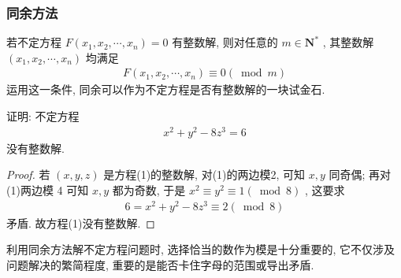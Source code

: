 \subsubsection{同余方法}
若不定方程 $F\left(x_{1}, x_{2}, \cdots, x_{n}\right)=0$ 有整数解, 则对任意的 $m \in \mathbf{N}^{*}$ , 其整数解 $\left(x_{1}, x_{2}, \cdots, x_{n}\right)$ 均满足
\begin{align*}
	F\left(x_{1}, x_{2}, \cdots, x_{n}\right) \equiv 0(\bmod m)
\end{align*}
运用这一条件, 同余可以作为不定方程是否有整数解的一块试金石.

\begin{example}
	证明: 不定方程
	\begin{align*}
		x^{2}+y^{2}-8 z^{3}=6
	\end{align*}
	没有整数解.
\end{example}
\begin{proof}
	若 $(x, y, z)$ 是方程(1)的整数解, 对(1)的两边模2, 可知 $x ,  y$ 同奇偶; 再对(1)两边模 4 可知 $x ,  y$ 都为奇数, 于是 $x^{2} \equiv y^{2} \equiv 1(\bmod 8)$ , 这要求
	\begin{align*}
		6=x^{2}+y^{2}-8 z^{3} \equiv 2(\bmod 8)
	\end{align*}
	矛盾. 故方程(1)没有整数解.
\end{proof}
\begin{note}
	利用同余方法解不定方程问题时, 选择恰当的数作为模是十分重要的, 它不仅涉及问题解决的繁简程度, 重要的是能否卡住字母的范围或导出矛盾.
\end{note}

